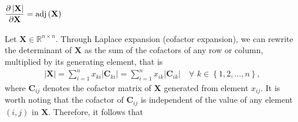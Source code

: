 \documentclass{article}
\newcommand{\adj}[1]{\ensuremath{\textnormal{adj}\left(#1\right)}} %
\newcommand\abs[1]{\left\lvert#1\right\rvert}
\begin{document}
\subsection{\(\dfrac{\partial \abs{\mathbf{X}}}{\partial \mathbf{X}} = \adj{\mathbf{X}}\)}
Let \(\mathbf{X} \in \mathbb{R}^{n\times n}\). Through Laplace expansion (cofactor expansion), we can rewrite the determinant of \(\mathbf{X}\) as the sum of the cofactors of any row or column, multiplied by its generating element, that is
\begin{align}
    \abs{\mathbf{X}} = \sum_{i = 1}^{n} x_{ki} \abs{\mathbf{C}_{ki}} = \sum_{i = 1}^{n} x_{ik} \abs{\mathbf{C}_{ik}} \,\,\,\,\,\, \forall \,\, k \in \left\{ 1, 2, ..., n \right\},
\end{align}
where \(\mathbf{C}_{ij}\) denotes the cofactor matrix of \(\mathbf{X}\) generated from element \(x_{ij}\). It is worth noting that the cofactor of \(\mathbf{C}_{ij}\) is independent of the value of any element \((i,j)\) in \(\mathbf{X}\). Therefore, it follows that
\end{document}
